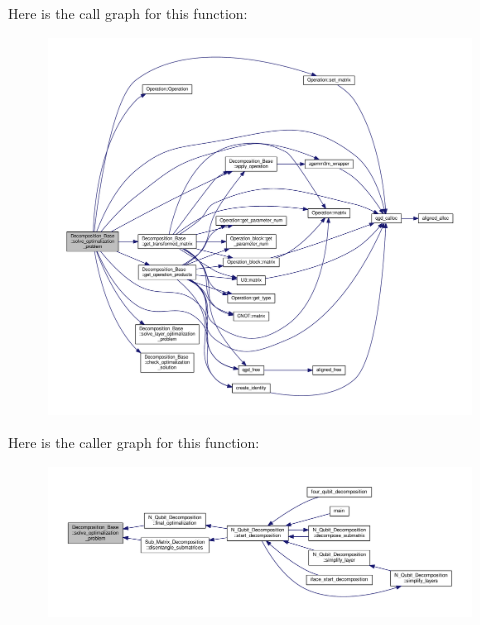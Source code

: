 Here is the call graph for this function\+:
\nopagebreak
\begin{figure}[H]
\begin{center}
\leavevmode
\includegraphics[width=350pt]{class_decomposition___base_ae21ecd8c5016a6ec942330247e8cdebc_cgraph}
\end{center}
\end{figure}




Here is the caller graph for this function\+:
\nopagebreak
\begin{figure}[H]
\begin{center}
\leavevmode
\includegraphics[width=350pt]{class_decomposition___base_ae21ecd8c5016a6ec942330247e8cdebc_icgraph}
\end{center}
\end{figure}


